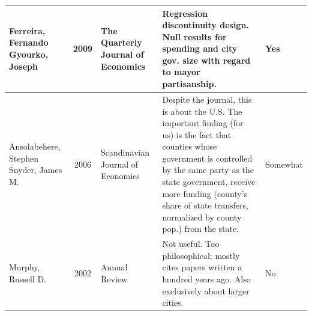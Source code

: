 \documentclass[11pt]{article}
\begin{document}
\begin{landscape}
\begin{table}[htbp]
\begin{tabular}{|p{2cm}|c|p{3cm}|p{12cm}|l|}
			Ferreira, Fernando
			Gyourko, Joseph & 2009 & The Quarterly Journal of Economics & Regression discontinuity design. Null results for spending and city gov. size with regard to mayor partisanship. & Yes \\ \hline
			Ansolabehere, Stephen
			Snyder, James M. & 2006 & Scandinavian Journal of Economics & Despite the journal, this is about the U.S. The important finding (for us) is the fact that counties whose government is controlled by the same party as the state government, receive more funding (county's share of state transfers, normalized by county pop.) from the state. & Somewhat \\ \hline
			Murphy, Russell D. & 2002 & Annual Review & Not useful. Too philosophical; mostly cites papers written a hundred years ago. Also exclusively about larger cities. & No \\ \hline
		\end{tabular}
		\label{}
	\end{table}
\end{landscape}
\end{document}
